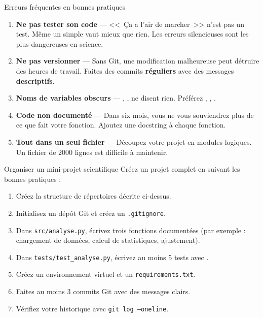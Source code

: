 \begin{errmark}{Erreurs fr\'equentes en bonnes pratiques}
\begin{enumerate}
  \item \textbf{Ne pas tester son code} --- <<~\c{C}a a l'air de marcher~>> n'est pas un
    test. M\^eme un simple  vaut mieux que rien. Les erreurs silencieuses
    sont les plus dangereuses en science.
  \item \textbf{Ne pas versionner} --- Sans Git, une modification malheureuse peut
    d\'etruire des heures de travail. Faites des commits \textbf{r\'eguliers} avec des
    messages \textbf{descriptifs}.
  \item \textbf{Noms de variables obscurs} --- , ,  ne
    disent rien. Pr\'ef\'erez , ,
    .
  \item \textbf{Code non document\'e} --- Dans six mois, vous ne vous souviendrez plus
    de ce que fait votre fonction. Ajoutez une docstring \`a chaque fonction.
  \item \textbf{Tout dans un seul fichier} --- D\'ecoupez votre projet en modules
    logiques. Un fichier de 2000 lignes est difficile \`a maintenir.
\end{enumerate}
\end{errmark}

\begin{projet}{Organiser un mini-projet scientifique}
Cr\'eez un projet complet en suivant les bonnes pratiques :
\begin{enumerate}
  \item Cr\'eez la structure de r\'epertoires d\'ecrite ci-dessus.
  \item Initialisez un d\'ep\^ot Git et cr\'eez un \texttt{.gitignore}.
  \item Dans \texttt{src/analyse.py}, \'ecrivez trois fonctions document\'ees
    (par exemple : chargement de donn\'ees, calcul de statistiques, ajustement).
  \item Dans \texttt{tests/test\_analyse.py}, \'ecrivez au moins 5 tests avec
    .
  \item Cr\'eez un environnement virtuel et un \texttt{requirements.txt}.
  \item Faites au moins 3 commits Git avec des messages clairs.
  \item V\'erifiez votre historique avec \texttt{git log --oneline}.
\end{enumerate}
\end{projet}

